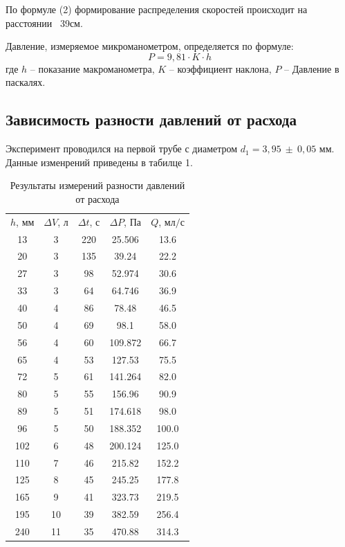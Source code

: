 \documentclass[a4paper, 12pt]{article}
\begin{document}
По формуле (2) формирование распределения скоростей происходит на расстоянии ~39см.

Давление, измеряемое микроманометром, определяется по формуле:
\[
P=9,81 \cdot K \cdot h 
\]
где $h$ -- показание макроманометра, $K$ -- коэффициент наклона, $P$ -- Давление в паскалях.

\subsection{Зависимость разности давлений от расхода}
Эксперимент проводился на первой трубе с диаметром $d_1=3,95\ \pm\ 0,05$ мм. Данные изменрений приведены в табилце 1.

\begin{table}[H]
    \centering
    \begin{tabular}{|c|c|c|c|c|}
        \hline $h$, мм & $\Delta V$, л & $\Delta t$, с & $\Delta P$, Па & $Q$, мл$/$с \\
        13 & 3 & 220 & 25.506 & 13.6 \\ \hline
        20 & 3 & 135 & 39.24 & 22.2 \\ \hline
        27 & 3 & 98 & 52.974 & 30.6 \\ \hline
        33 & 3 & 64 & 64.746 & 36.9 \\ \hline
        40 & 4 & 86 & 78.48 & 46.5 \\ \hline
        50 & 4 & 69 & 98.1 & 58.0 \\ \hline
        56 & 4 & 60 & 109.872 & 66.7 \\ \hline
        65 & 4 & 53 & 127.53 & 75.5 \\ \hline
        72 & 5 & 61 & 141.264 & 82.0 \\ \hline
        80 & 5 & 55 & 156.96 & 90.9 \\ \hline
        89 & 5 & 51 & 174.618 & 98.0 \\ \hline
        96 & 5 & 50 & 188.352 & 100.0 \\ \hline
        102 & 6 & 48 & 200.124 & 125.0 \\ \hline
        110 & 7 & 46 & 215.82 & 152.2 \\ \hline
        125 & 8 & 45 & 245.25 & 177.8 \\ \hline
        165 & 9 & 41 & 323.73 & 219.5 \\ \hline
        195 & 10 & 39 & 382.59 & 256.4 \\ \hline
        240 & 11 & 35 & 470.88 & 314.3 \\ \hline
    \end{tabular}
    \caption{Результаты измерений разности давлений от расхода}
    \label{tab:q(p)}
\end{table}
\end{document}
